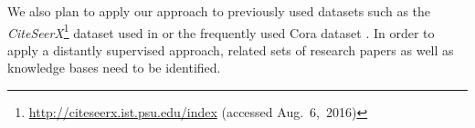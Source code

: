 \bigskip

We also plan to apply our approach to previously used datasets such as the \textit{CiteSeerX}\footnote{\url{http://citeseerx.ist.psu.edu/index} (accessed Aug.~6,~2016)} dataset used in \citet{councill2008parscit} or the frequently used Cora dataset \citep[e.g.][]{peng2004accurate,councill2008parscit,wu2014citeseerx}.
In order to apply a distantly supervised approach, related sets of research papers as well as knowledge bases need to be identified.

